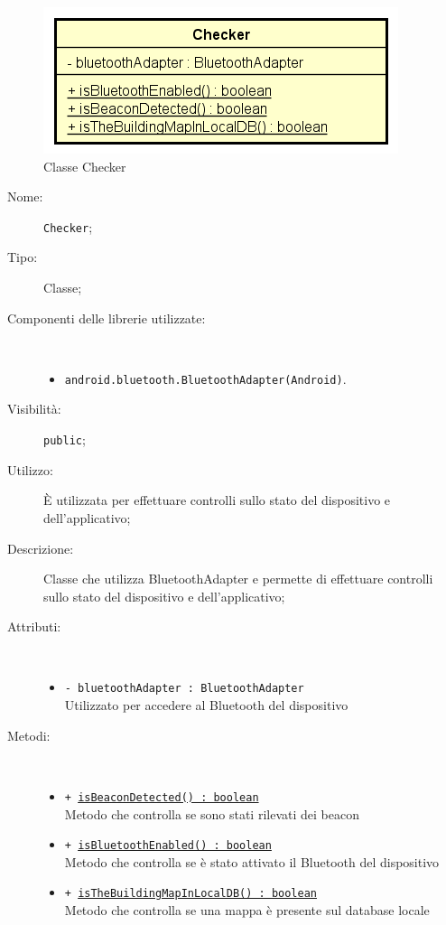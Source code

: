 \documentclass[../DefinizioneDiProdotto.tex]{subfiles}
\begin{document}
    \begin{figure}[H]
        \centering
        \includegraphics{img/Checker.png}
        \caption{Classe Checker}\label{fig:presenter::Checker} 
    \end{figure}
    \begin{description}
\item[Nome:] \texttt{Checker};
\item[Tipo:] Classe;
\item[Componenti delle librerie utilizzate:] \
\begin{itemize}
\item \texttt{android.bluetooth.BluetoothAdapter(Android)}.

\end{itemize}
\item[Visibilità:] \texttt{public};
\item[Utilizzo:] È utilizzata per effettuare controlli sullo stato del dispositivo e dell'applicativo;
\item[Descrizione:] Classe che utilizza BluetoothAdapter e permette di effettuare controlli sullo stato del dispositivo e dell'applicativo;
\item[Attributi:] \
\begin{itemize}
\item \texttt{- bluetoothAdapter : BluetoothAdapter}\\
Utilizzato per accedere al Bluetooth del dispositivo

\end{itemize}
\item[Metodi:] \
\begin{itemize}
\item \texttt{+ \underline{isBeaconDetected() : boolean}}\\
Metodo che controlla se sono stati rilevati dei beacon
 \item \texttt{+ \underline{isBluetoothEnabled() : boolean}}\\
Metodo che controlla se è stato attivato il Bluetooth del dispositivo
 \item \texttt{+ \underline{isTheBuildingMapInLocalDB() : boolean}}\\
Metodo che controlla se una mappa è presente sul database locale
 \end{itemize}
\end{description}
\end{document}

